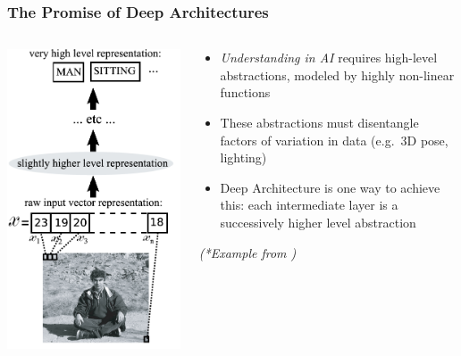 \documentclass{beamer}
\newcommand{\bi}{\begin{itemize}}
\newcommand{\ei}{\end{itemize}}
\begin{document}
\begin{frame}
\frametitle{The Promise of Deep Architectures}
\begin{columns}
\begin{column}{0.5\textwidth}
\centerline{\includegraphics[scale=0.3]{figs/bengio_sitting}}
\end{column}
\begin{column}{0.5\textwidth}
\bi
\item \textit{Understanding in AI} requires high-level abstractions, modeled by highly non-linear functions
\pause
\item These abstractions must disentangle factors of variation in data (e.g.~3D pose, lighting)
\pause
\item Deep Architecture is one way to achieve this: each intermediate layer is a successively higher level abstraction
\ei
\textit{(*Example from \cite{bengio09book})}
\end{column}
\end{columns}
\end{frame}
\end{document}
